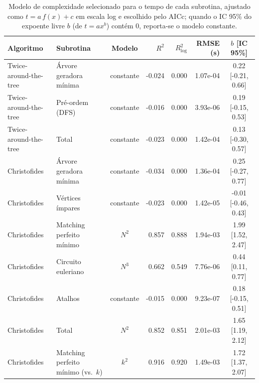 \begin{table}[ht]
\centering
\small
\caption{Modelo de complexidade selecionado para o tempo de cada subrotina, ajustado como $t = a\,f(x) + c$ em escala log e escolhido pelo AICc; quando o IC 95\% do expoente livre $b$ (de $t = a x^b$) contém 0, reporta-se o modelo constante.}
\label{tab:ajustes-tempo}
\begin{tabular}{llcrrrc}
\hline
Algoritmo & Subrotina & Modelo & $R^2$ & $R^2_{\log}$ & RMSE (s) & $b$ [IC 95\%] \\
\hline
Twice-around-the-tree & Árvore geradora mínima & constante & -0.024 & 0.000 & 1.07e-04 & 0.22 [-0.21, 0.66] \\
Twice-around-the-tree & Pré-ordem (DFS) & constante & -0.016 & 0.000 & 3.93e-06 & 0.19 [-0.15, 0.53] \\
Twice-around-the-tree & Total & constante & -0.023 & 0.000 & 1.42e-04 & 0.13 [-0.30, 0.57] \\
Christofides & Árvore geradora mínima & constante & -0.034 & 0.000 & 1.36e-04 & 0.25 [-0.27, 0.77] \\
Christofides & Vértices ímpares & constante & -0.023 & 0.000 & 1.42e-05 & -0.01 [-0.46, 0.43] \\
Christofides & Matching perfeito mínimo & $N^2$ & 0.857 & 0.888 & 1.94e-03 & 1.99 [1.52, 2.47] \\
Christofides & Circuito euleriano & $N^3$ & 0.662 & 0.549 & 7.76e-06 & 0.44 [0.11, 0.77] \\
Christofides & Atalhos & constante & -0.015 & 0.000 & 9.23e-07 & 0.18 [-0.15, 0.51] \\
Christofides & Total & $N^2$ & 0.852 & 0.851 & 2.01e-03 & 1.65 [1.19, 2.12] \\
Christofides & Matching perfeito mínimo (vs.\ $k$) & $k^2$ & 0.916 & 0.920 & 1.49e-03 & 1.72 [1.37, 2.07] \\
\hline
\end{tabular}
\end{table}